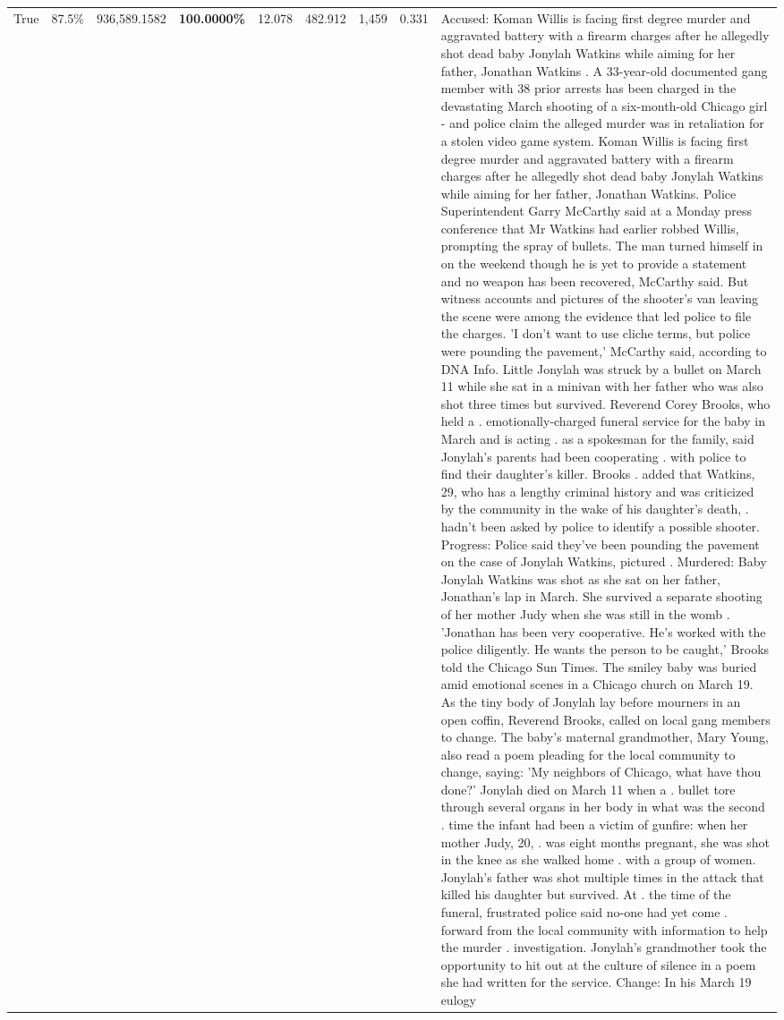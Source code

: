 \begin{table}[H]
\begin{tabular}{lllrlllll}
True & 87.5\% & 936,589.1582 & \bfseries \color{red} 100.0000\% & 12.078 & 482.912 & 1,459 & 0.331 & Accused: Koman Willis is facing first degree murder and aggravated battery with a firearm charges after he allegedly shot dead baby Jonylah Watkins while aiming for her father, Jonathan Watkins . A 33-year-old documented gang member with 38 prior arrests has been charged in the devastating March shooting of a six-month-old Chicago girl - and police claim the alleged murder was in retaliation for a stolen video game system. Koman Willis is facing first degree murder and aggravated battery with a firearm charges after he allegedly shot dead baby Jonylah Watkins while aiming for her father, Jonathan Watkins. Police Superintendent Garry McCarthy said at a Monday press conference that Mr Watkins had earlier robbed Willis, prompting the spray of bullets. The man turned himself in on the weekend though he is yet to provide a statement and no weapon has been recovered, McCarthy said. But witness accounts and pictures of the shooter's van leaving the scene were among the evidence that led police to file the charges. 'I don't want to use cliche terms, but police were pounding the pavement,' McCarthy said, according to DNA Info. Little Jonylah was struck by a bullet on March 11 while she sat in a minivan with her father who was also shot three times but survived. Reverend Corey Brooks, who held a . emotionally-charged funeral service for the baby in March and is acting . as a spokesman for the family, said Jonylah's parents had been cooperating . with police to find their daughter's killer. Brooks . added that Watkins, 29, who has a lengthy criminal history and was criticized by the community in the wake of his daughter's death, . hadn't been asked by police to identify a possible shooter. Progress: Police said they've been pounding the pavement on the case of Jonylah Watkins, pictured . Murdered: Baby Jonylah Watkins was shot as she sat on her father, Jonathan's lap in March. She survived a separate shooting of her mother Judy when she was still in the womb . 'Jonathan has been very cooperative. He's worked with the police diligently. He wants the person to be caught,' Brooks told the Chicago Sun Times. The smiley baby was buried amid emotional scenes in a Chicago church on March 19. As the tiny body of Jonylah lay before mourners in an open coffin, Reverend Brooks, called on local gang members to change. The baby's maternal grandmother, Mary Young, also read a poem pleading for the local community to change, saying: 'My neighbors of Chicago, what have thou done?' Jonylah died on March 11 when a . bullet tore through several organs in her body in what was the second . time the infant had been a victim of gunfire: when her mother Judy, 20, . was eight months pregnant, she was shot in the knee as she walked home . with a group of women. Jonylah's father was shot multiple times in the attack that killed his daughter but survived. At . the time of the funeral, frustrated police said no-one had yet come . forward from the local community with information to help the murder . investigation. Jonylah's grandmother took the opportunity to hit out at the culture of silence in a poem she had written for the service. Change: In his March 19 eulogy 
\end{tabular}
\end{table}
